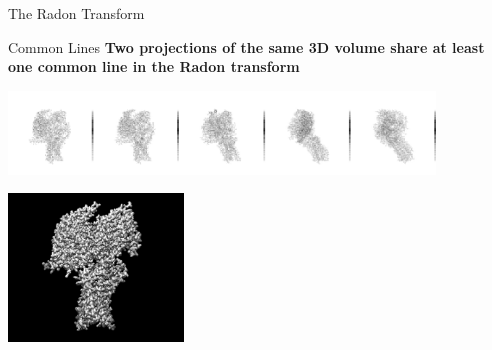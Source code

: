 \documentclass[t, 11pt, xcolor=dvipsnames]{beamer}
\begin{document}
\begin{frame}[fragile]{The Radon Transform}
{\begin{center}
    \end{center}}
\end{frame}

\begin{frame}[fragile]{Common Lines}
  \textbf{Two projections of the same 3D volume share at least one common line in the Radon transform}
 \begin{center}\includegraphics[width=0.85\textwidth]{images/common_line.png}
    \end{center}
 \begin{center}\includegraphics[width=0.35\textwidth]{images/3D_model.png}
    \end{center}
\end{frame}
\end{document}
